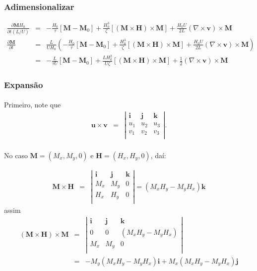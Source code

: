 \documentclass[eletromagnetismo.tex]{subfiles}
\begin{document}
\subsubsection{Adimensionalizar}
\begin{eqnarray}
\frac{\partial \mathbf{M} H_0}{\partial t(L/U)} &=& -\frac{H_0}{\tau}[\mathbf{M} - \mathbf{M}_0]+\frac{H_0^3}{\zeta}[(\mathbf{M}\times \mathbf{H})\times\mathbf{M}]+\frac{H_0 U}{2L}(\nabla\times \mathbf{v})\times \mathbf{M}\\
\frac{\partial \mathbf{M}}{\partial t} &=& \frac{L}{U H_0}\left(-\frac{H_0}{\tau}[\mathbf{M} - \mathbf{M}_0]+\frac{H_0^3}{\zeta}[(\mathbf{M}\times \mathbf{H})\times\mathbf{M}]+\frac{H_0 U}{2L}(\nabla\times \mathbf{v})\times \mathbf{M}\right)\\
&=&-\frac{L}{\tau U}[\mathbf{M} - \mathbf{M}_0]+\frac{L H_0^2}{U\zeta}[(\mathbf{M}\times \mathbf{H})\times\mathbf{M}]+\frac{1}{2}(\nabla\times \mathbf{v})\times \mathbf{M}
\end{eqnarray}

\subsubsection{Expansão}
\paragraph{} Primeiro, note que \begin{eqnarray}
	\mathbf{u}\times \mathbf{v} & = & \left| \begin{array}{ccc}
 	\mathbf{i} & \mathbf{j} & \mathbf{k}\\
 	u_1 & u_2 & u_3\\
 	v_1 & v_2 & v_3\\
 \end{array}
 \right|.
\end{eqnarray}
\paragraph{} No caso $\mathbf{M}=(M_x, M_y, 0)$ e $\mathbf{H}=(H_x, H_y, 0)$, daí:

\begin{eqnarray}
	\mathbf{M}\times \mathbf{H} & = & \left| \begin{array}{ccc}
 	\mathbf{i} & \mathbf{j} & \mathbf{k}\\
 	M_x & M_y & 0\\
 	H_x & H_y & 0\\
 \end{array}
 \right| = (M_x H_y - M_y H_x)\mathbf{k}
\end{eqnarray}
assim
\begin{eqnarray}
(\mathbf{M}\times \mathbf{H})\times \mathbf{M} & = & \left| \begin{array}{ccc}
 	\mathbf{i} & \mathbf{j} & \mathbf{k}\\
 	0 & 0 & (M_x H_y - M_y H_x)\\
 	M_x & M_y & 0\\
 \end{array}
 \right|\\ 
 &=& -M_y(M_x H_y - M_y H_x)\mathbf{i}+M_x(M_x H_y - M_y H_x)\mathbf{j}
\end{eqnarray}
\end{document}
